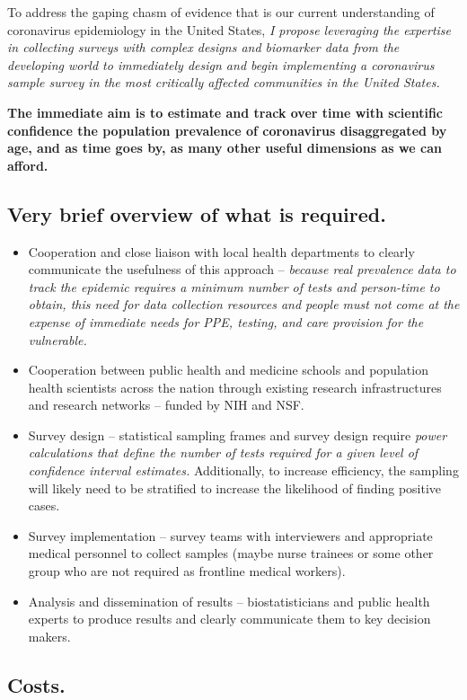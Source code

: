 \documentclass[12pt]{article}
\begin{document}
To address the gaping chasm of evidence that is our current understanding of coronavirus epidemiology in the United States, \textit{I propose leveraging the expertise in collecting surveys with complex designs and biomarker data from the developing world to immediately design and begin implementing a coronavirus sample survey in the most critically affected communities in the United States.}  

\textbf{The immediate aim is to estimate and track over time with scientific confidence the population prevalence of coronavirus disaggregated by age, and as time goes by, as many other useful dimensions as we can afford.}

\subsection{Very brief overview of what is required.}
\begin{itemize}
\item Cooperation and close liaison with local health departments to clearly communicate the usefulness of this approach -- \textit{because real prevalence data to track the epidemic requires a minimum number of tests and person-time to obtain, this need for data collection resources and people must not come at the expense of immediate needs for PPE, testing, and care provision for the vulnerable.} 
\item Cooperation between public health and medicine schools and population health scientists across the nation through existing research infrastructures and research networks -- funded by NIH and NSF.
\item Survey design -- statistical sampling frames and survey design require \textit{power calculations that define the number of tests required for a given level of confidence interval estimates.} Additionally, to increase efficiency, the sampling will likely need to be stratified to increase the likelihood of finding positive cases. 
\item Survey implementation -- survey teams with interviewers and appropriate medical personnel to collect samples (maybe nurse trainees or some other group who are not required as frontline medical workers).
\item Analysis and dissemination of results -- biostatisticians and public health experts to produce results and clearly communicate them to key decision makers.
\end{itemize}

\subsection{Costs.}
\end{document}
